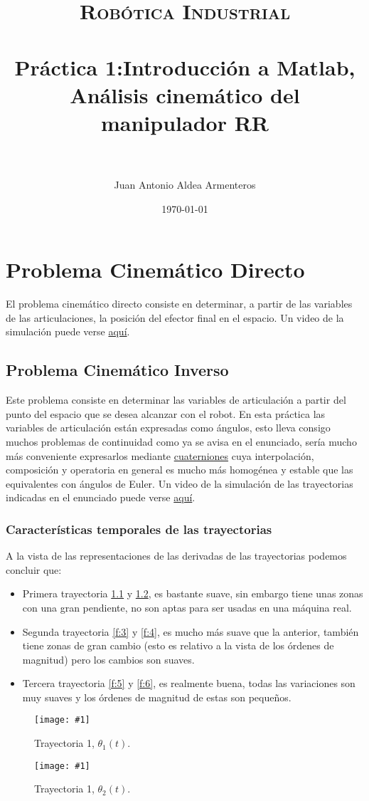 \documentclass[paper=a4, fontsize=11pt]{scrreprt} %
\title{
    \normalfont \normalsize 
    \textsc{Robótica Industrial} \\ [25pt] %
    \horrule{0.5pt} \\[0.4cm] %
    \huge Práctica 1:Introducción a Matlab, Análisis cinemático del manipulador RR \\ %
    \horrule{2pt} \\[0.5cm] %
}
\author{Juan Antonio Aldea Armenteros} %
\date{\normalsize\today} %
\newlength{\imgwidth}
\newcommand\scalegraphics[1]{
    \settowidth{\imgwidth}{\texttt{[image: \#1]}}
    \setlength{\imgwidth}{\minof{\imgwidth}{\textwidth}}
    \texttt{[image: \#1]}
}
\numberwithin{equation}{section} %
\numberwithin{figure}{section} %
\numberwithin{table}{section} %
\begin{document}
    \maketitle
    \chapter{Problema Cinemático Directo}
    El problema cinemático directo consiste en determinar, a partir de las variables de las articulaciones, la posición del efector final en el espacio.
    Un video de la simulación puede verse \href{http://youtu.be/QZf1Gd5Ehr0}{aquí}.

    \section{Problema Cinemático Inverso}
    Este problema consiste en determinar las variables de articulación a partir del punto del espacio que se desea alcanzar con el robot. En esta práctica las variables de articulación están expresadas como ángulos, esto lleva consigo muchos problemas de continuidad como ya se avisa en el enunciado, sería mucho más conveniente expresarlos mediante  \href{http://en.wikipedia.org/wiki/Quaternion}{cuaterniones} cuya interpolación, composición y operatoria en general es mucho más homogénea y estable que las equivalentes con ángulos de Euler.
    Un video de la simulación de las trayectorias indicadas en el enunciado puede verse \href{http://youtu.be/x5fxrR2QUQg}{aquí}.
    \subsection{Características temporales de las trayectorias}
    A la vista de las representaciones de las derivadas de las trayectorias podemos concluir que:
    \begin{itemize}
        \item Primera trayectoria \ref{f:1} y \ref{f:2}, es bastante suave, sin embargo tiene unas zonas con una gran pendiente, no son aptas para ser usadas en una máquina real.
        \item Segunda trayectoria \ref{f:3} y \ref{f:4}, es mucho más suave que la anterior, también tiene zonas de gran cambio (esto es relativo a la vista de los órdenes de magnitud) pero los cambios son suaves.
        \item Tercera trayectoria \ref{f:5} y \ref{f:6}, es realmente buena, todas las variaciones son muy suaves y los órdenes de magnitud de estas son pequeños. 
    \end{itemize}
    \begin{figure}
        \scalegraphics{imagenes/trayectoria-1-th1.png}
        \caption{Trayectoria 1, $\theta_1(t)$.}
        \label{f:1}
    \end{figure}
    \begin{figure}
        \scalegraphics{imagenes/trayectoria-1-th2.png}
        \caption{Trayectoria 1, $\theta_2(t)$.}
        \label{f:2}
    \end{figure}
    
\end{document}

